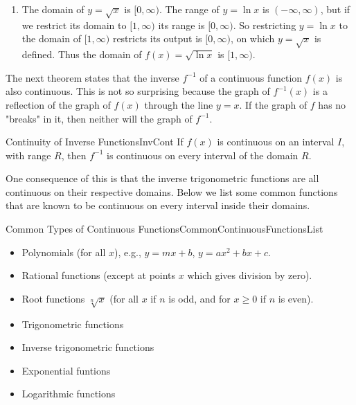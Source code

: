 \begin{solution}
{\begin{enumerate}
			\item		The domain of $y = \sqrt{x}$ is $[0,\infty)$. The range of $y=\ln x$ is $(-\infty,\infty)$, but if we restrict its domain to $[1,\infty)$ its range is $[0,\infty)$. So restricting $y = \ln x$ to the domain of $[1,\infty)$ restricts its output is $[0,\infty)$, on which $y = \sqrt{x}$ is defined. Thus the domain of $f(x) = \sqrt{\ln x}$ is $[1,\infty)$.
			\end{enumerate}
}
\end{solution}









The next theorem states that the inverse $ f^{-1} $ of a continuous function $ f(x) $ is also continuous. This is not so surprising because the graph of $ f^{-1}(x) $ is a reflection of the graph of $ f(x) $ through the line $ y=x $. If the graph of $ f $ has no "breaks" in it, then neither will the graph of $ f^{-1} $.

\begin{theorem}{Continuity of Inverse Functions}{InvCont}
If $ f(x) $ is continuous on an interval $ I $, with range $ R $, then $ f^{-1} $ is continuous on every interval of the domain $ R $.
\end{theorem}

One consequence of this is that the inverse trigonometric functions are all continuous on their respective domains. Below we list some common functions that are known to be continuous on every interval inside their domains.

\begin{example}{Common Types of Continuous Functions}{CommonContinuousFunctionsList}
\begin{itemize}
	\item	Polynomials (for all $x$), e.g., $y=mx+b$, $y=ax^2+bx+c$.
	\item	Rational functions (except at points $x$ which gives division by zero).
	\item	Root functions $\sqrt[n]{x}$ (for all $x$ if $n$ is odd, and for $x\geq 0$ if $n$ is even).
	\item	Trigonometric functions
	\item	Inverse trigonometric functions
	\item	Exponential funtions
	\item	Logarithmic functions
\end{itemize}
\end{example}

